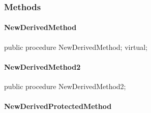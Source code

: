 \documentclass{report}
\begin{document}
\subsubsection*{\large{\textbf{Methods}}\normalsize\hspace{1ex}\hfill}
\paragraph*{NewDerivedMethod}\hspace*{\fill}

\begin{list}{}{
\setlength{\itemindent}{0cm}
\setlength{\listparindent}{0cm}
\setlength{\leftmargin}{\evensidemargin}
\addtolength{\leftmargin}{\tmplength}
\settowidth{\labelsep}{X}
\addtolength{\leftmargin}{\labelsep}
\setlength{\labelwidth}{\tmplength}
}
\begin{flushleft}
\item[\textbf{Declaration}\hfill]
\begin{ttfamily}
public procedure NewDerivedMethod; virtual;\end{ttfamily}


\end{flushleft}
\end{list}
\paragraph*{NewDerivedMethod2}\hspace*{\fill}

\begin{list}{}{
\setlength{\itemindent}{0cm}
\setlength{\listparindent}{0cm}
\setlength{\leftmargin}{\evensidemargin}
\addtolength{\leftmargin}{\tmplength}
\settowidth{\labelsep}{X}
\addtolength{\leftmargin}{\labelsep}
\setlength{\labelwidth}{\tmplength}
}
\begin{flushleft}
\item[\textbf{Declaration}\hfill]
\begin{ttfamily}
public procedure NewDerivedMethod2;\end{ttfamily}


\end{flushleft}
\end{list}
\paragraph*{NewDerivedProtectedMethod}\hspace*{\fill}
\end{document}
